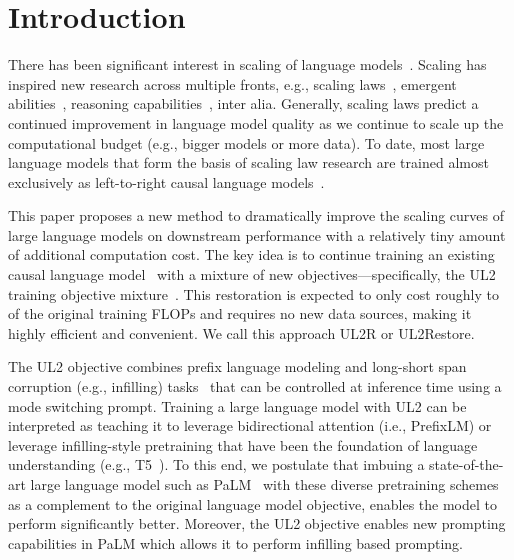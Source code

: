 \documentclass{article}
\newcommand{\methodname}{UL2R\xspace}
\begin{document}
\newpage


\section{Introduction}

There has been significant interest in scaling of language models~\citep{rae2021scaling,chowdhery2022palm,brown2020language}. Scaling has inspired new research across multiple fronts, e.g., scaling laws~\citep{kaplan2020scaling,hoffmann2022training,tay2022scaling}, emergent abilities~\citep{wei2022emergent,ganguli2022predictability}, reasoning capabilities~\citep{wei2022chain,lewkowycz2022solving}, inter alia. Generally, scaling laws predict a continued improvement in language model quality as we continue to scale up the computational budget (e.g., bigger models or more data). To date, most large language models that form the basis of scaling law research are trained almost exclusively as left-to-right causal language models~\citep{kaplan2020scaling,hoffmann2022training}.

This paper proposes a new method to dramatically improve the scaling curves of large language models on downstream performance with a relatively tiny amount of additional computation cost. The key idea is to continue training an existing causal language model~\citep{chowdhery2022palm} with a mixture of new objectives---specifically, the UL2 training objective mixture~\citep{tay2022unifying}. This restoration is expected to only cost roughly  to  of the original training FLOPs and requires no new data sources, making it highly efficient and convenient. We call this approach \methodname or UL2Restore.

The UL2 objective combines prefix language modeling and long-short span corruption (e.g., infilling) tasks~\citep{raffel2019exploring} that can be controlled at inference time using a mode switching prompt. Training a large language model with UL2 can be interpreted as teaching it to leverage bidirectional attention (i.e., PrefixLM) or leverage infilling-style pretraining that have been the foundation of language understanding (e.g., T5~\citep{raffel2019exploring}). To this end, we postulate that imbuing a state-of-the-art large language model such as PaLM~\citep{chowdhery2022palm} with these diverse pretraining schemes as a complement to the original language model objective, enables the model to perform significantly better. Moreover, the UL2 objective enables new prompting capabilities in PaLM which allows it to perform infilling based prompting. 
\end{document}
